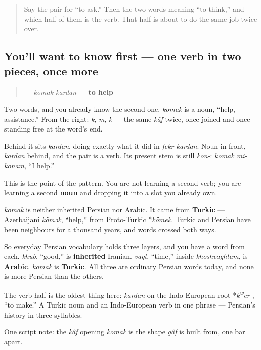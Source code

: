 \label{lesson:FA-C08-komak-kardan}



\begin{quote}
Say the pair for “to ask.” Then the two words meaning “to think,” and which half of them is the verb. That half is about to do the same job twice over.
\end{quote}

\subsection*{You'll want to know first — one verb in two pieces, once more}
\begin{quote}
\textbf{ } — \emph{komak kardan} — \textbf{to help}
\end{quote}

Two words, and you already know the second one. \textbf{} \emph{komak} is a noun, “help, assistance.” From the right: \textbf{} \emph{k}, \textbf{} \emph{m}, \textbf{} \emph{k} — the same \emph{kâf} twice, once joined and once standing free at the word's end.

Behind it sits \textbf{} \emph{kardan}, doing exactly what it did in \emph{fekr kardan}. Noun in front, \emph{kardan} behind, and the pair is a verb. Its present stem is still \textbf{} \emph{kon-}: \emph{komak mi-konam}, “I help.”

This is the point of the pattern. You are not learning a second verb; you are learning a second \textbf{noun} and dropping it into a slot you already own.

\begin{cousinweb}
\textbf{} \emph{komak} is neither inherited Persian nor Arabic. It came from \textbf{Turkic} — Azerbaijani \emph{kömək}, “help,” from Proto-Turkic *\emph{kömek}. Turkic and Persian have been neighbours for a thousand years, and words crossed both ways.

So everyday Persian vocabulary holds three layers, and you have a word from each. \emph{khub}, “good,” is \textbf{inherited} Iranian. \emph{vaqt}, “time,” inside \emph{khoshvaghtam}, is \textbf{Arabic}. \textbf{} \emph{komak} is \textbf{Turkic}. All three are ordinary Persian words today, and none is more Persian than the others.

The verb half is the oldest thing here: \textbf{} \emph{kardan} on the Indo-European root *\emph{k\textsuperscript{w}er-}, “to make.” A Turkic noun and an Indo-European verb in one phrase — Persian's history in three syllables.

One script note: the \textbf{} \emph{kâf} opening \emph{komak} is the shape \emph{gâf} is built from, one bar apart.
\end{cousinweb}

